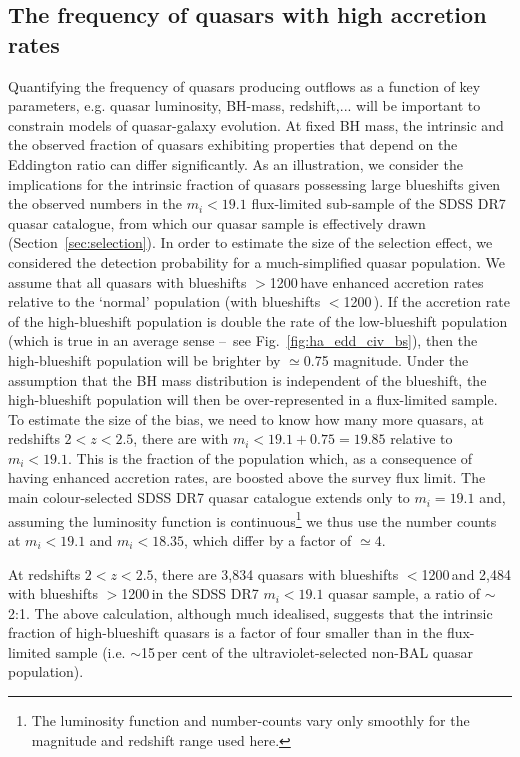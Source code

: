 \subsection{The frequency of quasars with high accretion rates}

Quantifying the frequency of quasars producing outflows as a function of key parameters, e.g. quasar luminosity, BH-mass, redshift,... will be important to constrain models of quasar-galaxy evolution.  
At fixed BH mass, the intrinsic and the observed fraction of quasars exhibiting properties that depend on the Eddington ratio can differ significantly. 
As an illustration, we consider the implications for the intrinsic fraction of quasars possessing large  blueshifts given the observed numbers in the $m_i<19.1$ flux-limited sub-sample of the SDSS DR7 quasar catalogue, from which our quasar sample is effectively drawn (Section~\ref{sec:selection}). 
In order to estimate the size of the selection effect, we considered the detection probability for a much-simplified quasar population. 
We assume that all quasars with  blueshifts $>$1200\,\kms have enhanced accretion rates relative to the `normal' population (with  blueshifts $<$1200\,\kms). 
If the accretion rate of the high-blueshift population is double the rate of the low-blueshift population (which is true in an average sense \---\ see Fig.~\ref{fig:ha_edd_civ_bs}), then the high-blueshift population will be brighter by $\simeq$0.75 magnitude.
Under the assumption that the BH mass distribution is independent of the  blueshift, the high-blueshift population will then be over-represented in a flux-limited sample.
To estimate the size of the bias, we need to know how many more quasars, at redshifts $2 < z < 2.5$, there are with $m_i<19.1+0.75=19.85$ relative to $m_i < 19.1$.
This is the fraction of the population which, as a consequence of having enhanced accretion rates, are boosted above the survey flux limit.    
The main colour-selected SDSS DR7 quasar catalogue extends only to $m_i= 19.1$ and, assuming the luminosity function is continuous\footnote{The luminosity function and number-counts vary only smoothly \citep[e.g.][]{ross13} for the magnitude and redshift range used here.} we thus use the number counts at $m_i < 19.1$ and $m_i < 18.35$, which differ by a factor of $\simeq 4$. 

At redshifts $2 < z <2.5$, there are 3,834 quasars with  blueshifts $<$1200\,\kms and 2,484 with blueshifts $>$1200\,\kms in the SDSS DR7 $m_i < 19.1$ quasar sample, a ratio of $\sim$2:1. 
The above calculation, although much idealised, suggests that the intrinsic fraction of high-blueshift quasars is a factor of four smaller than in the flux-limited sample (i.e. $\sim$15\,per cent of the ultraviolet-selected non-BAL quasar population). 


